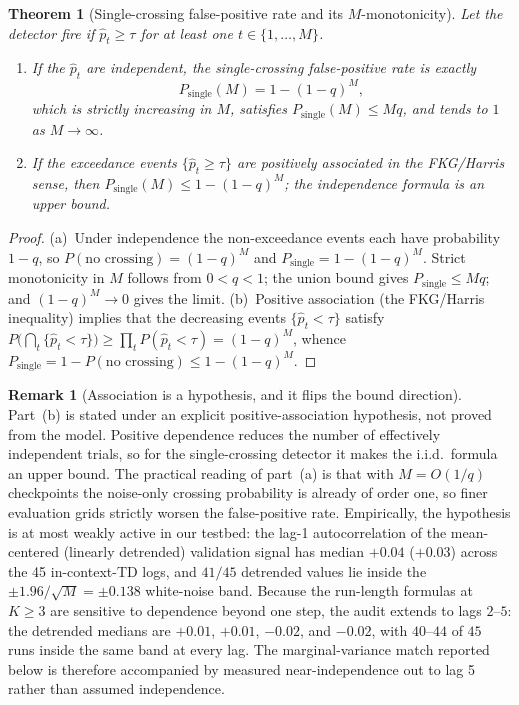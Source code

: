 \documentclass[11pt]{article}
\theoremstyle{plain}
\newtheorem{theorem}{Theorem}
\theoremstyle{definition}
\newtheorem{remark}{Remark}
\begin{document}
\begin{theorem}[Single-crossing false-positive rate and its $M$-monotonicity]\label{thm:single}
Let the detector fire if $\hat p_t \geq \tau$ for at least one $t\in\{1,\dots,M\}$.
\begin{enumerate}
\item[\textnormal{(a)}] If the $\hat p_t$ are independent, the single-crossing
  false-positive rate is exactly
  \[
    P_{\mathrm{single}}(M) = 1-(1-q)^{M},
  \]
  which is strictly increasing in $M$, satisfies $P_{\mathrm{single}}(M)\leq Mq$, and
  tends to $1$ as $M\to\infty$.
\item[\textnormal{(b)}] If the exceedance events $\{\hat p_t\geq\tau\}$ are positively
  associated in the FKG/Harris sense, then $P_{\mathrm{single}}(M)\leq 1-(1-q)^{M}$; the
  independence formula is an upper bound.
\end{enumerate}
\end{theorem}

\begin{proof}
(a)~Under independence the non-exceedance events each have probability $1-q$, so
$P(\text{no crossing})=(1-q)^{M}$ and $P_{\mathrm{single}}=1-(1-q)^{M}$. Strict
monotonicity in $M$ follows from $0<q<1$; the union bound gives $P_{\mathrm{single}}\leq
Mq$; and $(1-q)^{M}\to0$ gives the limit.
(b)~Positive association (the FKG/Harris inequality) implies that the decreasing events
$\{\hat p_t<\tau\}$ satisfy $P\!\bigl(\bigcap_{t}\{\hat p_t<\tau\}\bigr)\geq\prod_{t}
P(\hat p_t<\tau)=(1-q)^{M}$, whence $P_{\mathrm{single}}=1-P(\text{no crossing})\leq
1-(1-q)^{M}$.
\end{proof}

\begin{remark}[Association is a hypothesis, and it flips the bound direction]\label{rem:assoc}
Part~(b) is stated under an explicit positive-association hypothesis, not proved from
the model. Positive dependence reduces the number of effectively independent trials, so for
the single-crossing detector it makes the i.i.d.\ formula an upper bound. The
practical reading of part~(a) is that with $M=O(1/q)$ checkpoints the noise-only crossing
probability is already of order one, so finer evaluation grids strictly worsen the
false-positive rate. Empirically, the hypothesis is at most weakly active in our testbed:
the lag-1 autocorrelation of the mean-centered (linearly detrended) validation signal has
median $+0.04$ ($+0.03$) across the 45 in-context-TD logs, and $41/45$ detrended values lie
inside the $\pm1.96/\sqrt{M}=\pm0.138$ white-noise band. Because the run-length formulas
at $K\geq3$ are sensitive to dependence beyond one step, the audit extends to lags
$2$--$5$: the detrended medians are $+0.01$, $+0.01$, $-0.02$, and $-0.02$, with
$40$--$44$ of $45$ runs inside the same band at every lag. The marginal-variance match
reported below is therefore accompanied by measured near-independence out to lag 5 rather
than assumed independence.
\end{remark}
\end{document}
